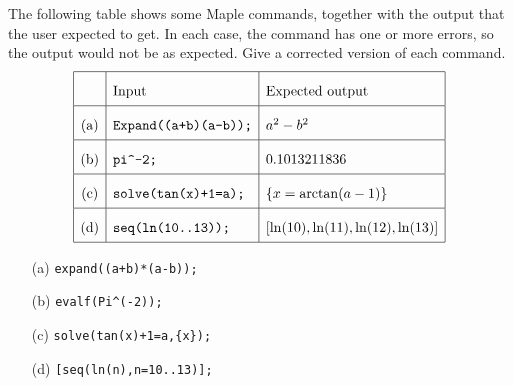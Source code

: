 \documentclass[a4paper]{article}
\begin{document}
\begin{problem}
 The following table shows some Maple commands, together
 with the output that the user expected to get.  In each
 case, the command has one or more errors, so the output
 would not be as expected.  Give a corrected version of each
 command.   
 \[ \renewcommand{\arraystretch}{2}
    \begin{array}{|c|l|l|}
     \hline
      & \mbox{Input} & \mbox{Expected output} \\ \hline
      \mbox{(a)} &
      \verb~Expand((a+b)(a-b));~ &
      a^2-b^2 \\ \hline
      \mbox{(b)} &
      \verb~pi^-2;~ &
      0.1013211836 \\ \hline
      \mbox{(c)} &
      \verb~solve(tan(x)+1=a);~ &
      \{x = \arctan(a-1)\} \\ \hline
      \mbox{(d)} &
      \verb~seq(ln(10..13));~ &
      [\ln(10),\ln(11),\ln(12),\ln(13)] \\ \hline
    \end{array}
 \]
\end{problem}
\begin{solution}
 \begin{itemize}
  \item[(a)] \verb~expand((a+b)*(a-b));~         \hspace{2em}
  \item[(b)] \verb~evalf(Pi^(-2));~               \hspace{2em}
  \item[(c)] \verb~solve(tan(x)+1=a,{x});~          \hspace{2em}
  \item[(d)] \verb~[seq(ln(n),n=10..13)];~         \hspace{2em}
 \end{itemize}
\end{solution}
\end{document}
